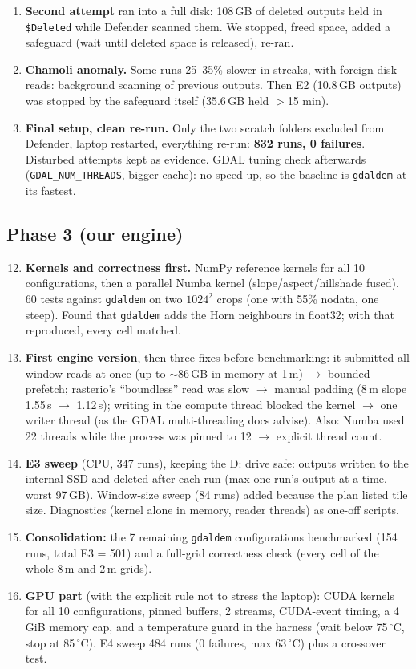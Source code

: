 ﻿\documentclass[11pt,a4paper]{article}
\newcommand{\code}[1]{\texttt{#1}}
\begin{document}
\begin{enumerate}
measured (tiny). Run conditions saved with every sweep.
\item \textbf{Second attempt} ran into a full disk: 108\,GB of deleted outputs held in \code{\$Deleted} while Defender
scanned them. We stopped, freed space, added a safeguard (wait until deleted space is released), re-ran.
\item \textbf{Chamoli anomaly.} Some runs 25--35\% slower in streaks, with foreign disk reads: background scanning of
previous outputs. Then E2 (10.8\,GB outputs) was stopped by the safeguard itself (35.6\,GB held $>$15 min).
\item \textbf{Final setup, clean re-run.} Only the two scratch folders excluded from Defender, laptop restarted, everything
re-run: \textbf{832 runs, 0 failures}. Disturbed attempts kept as evidence. GDAL tuning check afterwards
(\code{GDAL\_NUM\_THREADS}, bigger cache): no speed-up, so the baseline is \code{gdaldem} at its fastest.
\end{enumerate}

\subsection{Phase 3 (our engine)}
\begin{enumerate}
\setcounter{enumi}{11}
\item \textbf{Kernels and correctness first.} NumPy reference kernels for all 10 configurations, then a parallel Numba
kernel (slope/aspect/hillshade fused). 60 tests against \code{gdaldem} on two $1024^2$ crops (one with 55\% nodata, one
steep). Found that \code{gdaldem} adds the Horn neighbours in float32; with that reproduced, every cell matched.
\item \textbf{First engine version}, then three fixes before benchmarking: it submitted all window reads at once (up to
$\sim$86\,GB in memory at 1\,m) $\to$ bounded prefetch; rasterio's ``boundless'' read was slow $\to$ manual padding
(8\,m slope 1.55\,s $\to$ 1.12\,s); writing in the compute thread blocked the kernel $\to$ one writer thread (as the GDAL
multi-threading docs advise). Also: Numba used 22 threads while the process was pinned to 12 $\to$ explicit thread count.
\item \textbf{E3 sweep} (CPU, 347 runs), keeping the D: drive safe: outputs written to the internal SSD
and deleted after each run (max one run's output at a time, worst 97\,GB). Window-size sweep (84 runs) added because
the plan listed tile size. Diagnostics (kernel alone in memory, reader threads) as one-off scripts.
\item \textbf{Consolidation:} the 7 remaining \code{gdaldem} configurations benchmarked (154 runs, total E3 = 501) and a
full-grid correctness check (every cell of the whole 8\,m and 2\,m grids).
\item \textbf{GPU part} (with the explicit rule not to stress the laptop): CUDA kernels for all 10 configurations,
pinned buffers, 2 streams, CUDA-event timing, a 4\,GiB memory cap, and a temperature guard in the harness (wait below
75\,$^\circ$C, stop at 85\,$^\circ$C). E4 sweep 484 runs (0 failures, max 63\,$^\circ$C) plus a crossover test.
\end{enumerate}
\end{document}
